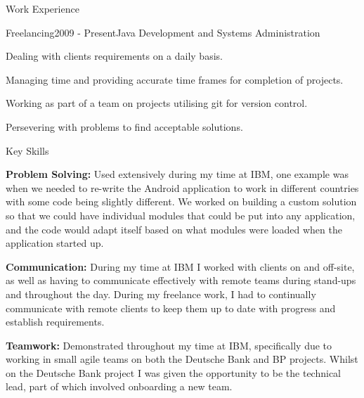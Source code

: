 \documentclass{resume} %
\begin{document}
\begin{rSection}{Work Experience}

\begin{rSubsection}{Freelancing}{2009 - Present}{Java Development and Systems Administration}{}
\item Dealing with clients requirements on a daily basis.
\item Managing time and providing accurate time frames for completion of projects.
\item Working as part of a team on projects utilising git for version control.
\item Persevering with problems to find acceptable solutions.
\end{rSubsection}

\end{rSection}


\begin{rSectionList}{Key Skills}
\item \textbf{Problem Solving:}
Used extensively during my time at IBM, one example was when we needed to re-write the Android application to work in different countries with some code being slightly different. We worked on building a custom solution so that we could have individual modules that could be put into any application, and the code would adapt itself based on what modules were loaded when the application started up.

\item \textbf{Communication:} 
During my time at IBM I worked with clients on and off-site, as well as having to communicate effectively with remote teams during stand-ups and throughout the day. During my freelance work, I had to continually communicate with remote clients to keep them up to date with progress and establish requirements.

\item \textbf{Teamwork:}
Demonstrated throughout my time at IBM, specifically due to working in small agile teams on both the Deutsche Bank and BP projects. Whilst on the Deutsche Bank project I was given the opportunity to be the technical lead, part of which involved onboarding a new team.
\end{rSectionList}

\end{document}

